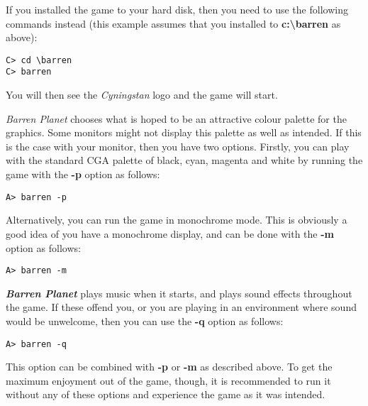 \noindent
If you installed the game to your hard disk, then you need to use the following commands instead (this example assumes that you installed to {\bf c:{\textbackslash}barren} as above):

\begin{verbatim}
C> cd \barren
C> barren
\end{verbatim}

\noindent
You will then see the {\it Cyningstan} logo and the game will start.

{\it Barren Planet} chooses what is hoped to be an attractive colour palette for the graphics. Some monitors might not display this palette as well as intended. If this is the case with your monitor, then you have two options. Firstly, you can play with the standard CGA palette of black, cyan, magenta and white by running the game with the {\bf -p} option as follows:

\begin{verbatim}
A> barren -p
\end{verbatim}

\noindent
Alternatively, you can run the game in monochrome mode. This is obviously a good idea of you have a monochrome display, and can be done with the {\bf -m} option as follows:

\begin{verbatim}
A> barren -m
\end{verbatim}

{\bf \it Barren Planet} plays music when it starts, and plays sound effects throughout the game. If these offend you, or you are playing in an environment where sound would be unwelcome, then you can use the {\bf -q} option as follows:

\begin{verbatim}
A> barren -q
\end{verbatim}

\noindent
This option can be combined with {\bf -p} or {\bf -m} as described above. To get the maximum enjoyment out of the game, though, it is recommended to run it without any of these options and experience the game as it was intended.
